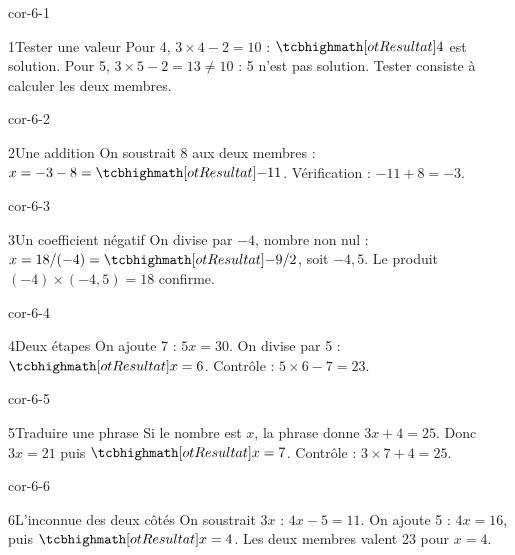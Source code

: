 \clearpage\pagestyle{otMain}\setlength{\otBlocEspacement}{2.5mm}\fontsize{11}{15}\selectfont{}
\begin{blocLivre}{cor-6-1}\begin{corrige}{1}{Tester une valeur}
Pour 4, $3\times4-2=10$ : $\res4$ est solution. Pour 5, $3\times5-2=13\ne10$ : 5 n’est pas solution. Tester consiste à calculer les deux membres.
\end{corrige}\end{blocLivre}
\begin{blocLivre}{cor-6-2}\begin{corrige}{2}{Une addition}
On soustrait 8 aux deux membres : $x=-3-8=\res{-11}$. Vérification : $-11+8=-3$.
\end{corrige}\end{blocLivre}
\begin{blocLivre}{cor-6-3}\begin{corrige}{3}{Un coefficient négatif}
On divise par $-4$, nombre non nul : $x=18/(-4)=\res{-9/2}$, soit $-4{,}5$. Le produit $(-4)\times(-4{,}5)=18$ confirme.
\end{corrige}\end{blocLivre}
\begin{blocLivre}{cor-6-4}\begin{corrige}{4}{Deux étapes}
On ajoute 7 : $5x=30$. On divise par 5 : $\res{x=6}$. Contrôle : $5\times6-7=23$.
\end{corrige}\end{blocLivre}
\begin{blocLivre}{cor-6-5}\begin{corrige}{5}{Traduire une phrase}
Si le nombre est $x$, la phrase donne $3x+4=25$. Donc $3x=21$ puis $\res{x=7}$. Contrôle : $3\times7+4=25$.
\end{corrige}\end{blocLivre}
\begin{blocLivre}{cor-6-6}\begin{corrige}{6}{L’inconnue des deux côtés}
On soustrait $3x$ : $4x-5=11$. On ajoute 5 : $4x=16$, puis $\res{x=4}$. Les deux membres valent 23 pour $x=4$.
\end{corrige}\end{blocLivre}
